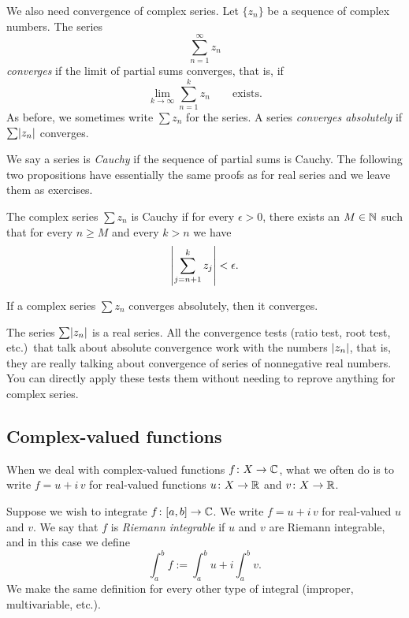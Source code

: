 We also need convergence of complex series.  Let $\{ z_n \}$ be a
sequence of complex
numbers. The series
\begin{equation*}
\sum_{n=1}^\infty z_n
\end{equation*}
\emph{converges} if the limit of partial sums converges, that is, if
\begin{equation*}
\lim_{k\to\infty} \sum_{n=1}^k z_n \qquad \text{exists.}
\end{equation*}
As before, we sometimes write $\sum z_n$ for the series.
A series \emph{converges absolutely} if $\sum \lvert {z_n} \rvert$ converges.

We say a series
is \emph{Cauchy}
if the sequence of partial sums is Cauchy.  The following two
propositions have essentially the same proofs as for real series and we
leave them as exercises.

\begin{prop} \label{prop:cachysercomplex}
The complex series $\sum z_n$ is Cauchy if for every $\epsilon > 0$, 
there exists an $M \in {\mathbb{N}}$ such that for every $n \geq M$
and every $k > n$ we have
\begin{equation*}
\left\lvert { \sum_{j={n+1}}^k z_j } \right\rvert
< \epsilon .
\end{equation*}
\end{prop}

\begin{prop} \label{prop:absconvmeansconv}
If a complex series $\sum z_n$ converges absolutely, then it converges.
\end{prop}

The series $\sum \lvert {z_n} \rvert$ is a real series.  All the
convergence tests (ratio test, root test, etc.)\ that talk about
absolute convergence work with the numbers $\lvert {z_n} \rvert$, that is, they
are really talking about convergence of series of nonnegative real
numbers.
You
can directly apply these tests
them without needing to reprove anything for complex
series.

\subsection{Complex-valued functions}

When we deal with complex-valued functions
$f \colon X \to {\mathbb{C}}$, what we often do is to write
$f = u+i\,v$ for real-valued functions $u \colon X \to {\mathbb{R}}$ and $v \colon X \to
{\mathbb{R}}$.

Suppose we wish to integrate
$f \colon [a,b] \to {\mathbb{C}}$.  We write
$f = u+i\,v$ for real-valued $u$ and $v$.
We say that $f$ is \emph{Riemann integrable}
if $u$ and $v$ are Riemann
integrable, and in this case we define
\begin{equation*}
\int_a^b f := \int_a^b u + i \int_a^b v .
\end{equation*}
We make the same definition for every other type of integral (improper,
multivariable, etc.).


